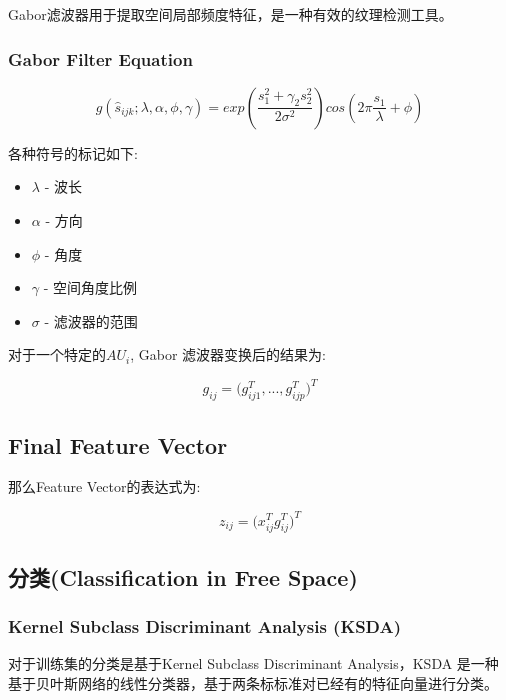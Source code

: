 \documentclass[11pt, a4paper]{article}
\begin{document}
Gabor滤波器用于提取空间局部频度特征，是一种有效的纹理检测工具。

\subsubsection{Gabor Filter Equation}

\begin{equation}
g(\widehat{s}_{ijk};\lambda,\alpha,\phi,\gamma) = exp(\frac{s^{2}_{1} + \gamma_{2}s^2_{2}}{2\sigma^2})cos(2\pi \frac{s_1}{\lambda} + \phi)
\end{equation}

各种符号的标记如下:

\begin{itemize}
\item $\lambda$ - 波长
\item $\alpha$ - 方向
\item $\phi$ - 角度
\item $\gamma$ - 空间角度比例
\item $\sigma$ - 滤波器的范围
\end{itemize}

对于一个特定的$AU_{i}$, Gabor 滤波器变换后的结果为:

\begin{equation}
g_{ij} = (g^{T}_{ij1},...,g^{T}_{ijp}{)}^{T}
\end{equation}

\subsection{Final Feature Vector}

那么Feature Vector的表达式为:

\begin{equation}
	z_{ij} = (x^{T}_{ij}g^{T}_{ij}{)}^{T}
\end{equation}

\subsection{分类(Classification in Free Space)}

\subsubsection{Kernel Subclass Discriminant Analysis (KSDA)}

对于训练集的分类是基于Kernel Subclass Discriminant Analysis，KSDA 是一种基于贝叶斯网络的线性分类器，基于两条标标准对已经有的特征向量进行分类。
\end{document}
